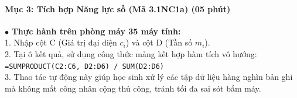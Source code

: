 \documentclass[12pt, a4paper]{article}
\begin{document}
\paragraph{Mục 3: Tích hợp Năng lực số (Mã 3.1NC1a) (05 phút)}

\begin{pedabox}
    $\bullet$ \textbf{Thực hành trên phòng máy 35 máy tính:}\\
    1. Nhập cột C (Giá trị đại diện $c_i$) và cột D (Tần số $m_i$).\\
    2. Tại ô kết quả, sử dụng công thức mảng kết hợp hàm tích vô hướng:\\
    \texttt{=SUMPRODUCT(C2:C6, D2:D6) / SUM(D2:D6)}\\
    3. Thao tác tự động này giúp học sinh xử lý các tập dữ liệu hàng nghìn bản ghi mà không mất công nhân cộng thủ công, tránh tối đa sai sót bấm máy.
\end{pedabox}
\end{document}
